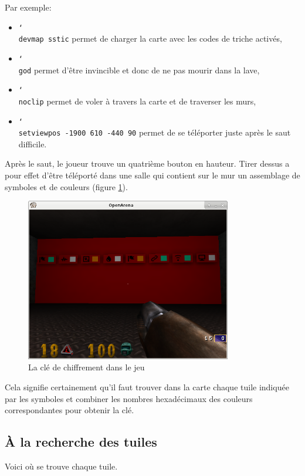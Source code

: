 \documentclass[a4paper,10pt]{article}
\newcommand{\bksl}{\char`\\} %
\begin{document}
\clearpage
Par exemple:
\begin{itemize}
  \item \texttt{\bksl{}devmap sstic} permet de charger la carte avec les codes de triche activés,
  \item \texttt{\bksl{}god} permet d'être invincible et donc de ne pas mourir dans la lave,
  \item \texttt{\bksl{}noclip} permet de voler à travers la carte et de traverser les murs,
  \item \texttt{\bksl{}setviewpos -1900 610 -440 90} permet de se téléporter juste après le saut difficile.
\end{itemize}

Après le saut, le joueur trouve un quatrième bouton en hauteur.
Tirer dessus a pour effet d'être téléporté dans une salle qui contient sur le mur un assemblage de symboles et de couleurs (figure \ref{shot2-key}).

\begin{figure}[ht]
  \centering
  \includegraphics[width=9cm]{stage2/oashot-keywall.png}
  \caption{La clé de chiffrement dans le jeu}
  \label{shot2-key}
\end{figure}

Cela signifie certainement qu'il faut trouver dans la carte chaque tuile indiquée par les symboles et combiner les nombres hexadécimaux des couleurs correspondantes pour obtenir la clé.

\subsection{À la recherche des tuiles}

Voici où se trouve chaque tuile.
\end{document}
